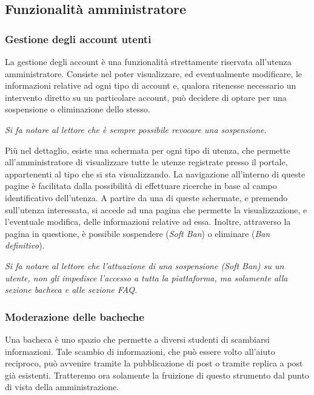\documentclass [a4paper,11pt]{book}
\begin{document}
\subsection{Funzionalità amministratore}

\subsubsection{Gestione degli account utenti}

La gestione degli account è una funzionalità strettamente riservata all'utenza  amministratore. Consiste nel poter visualizzare, ed eventualmente modificare, le informazioni relative ad ogni tipo di account e, qualora ritenesse necessario un intervento diretto su un particolare account, può decidere di optare per una sospensione o eliminazione dello stesso.

\emph{Si fa notare al lettore che è sempre possibile revocare una sospensione.} 

Più nel dettaglio, esiste una schermata per ogni tipo di utenza, che permette all'amministratore di visualizzare tutte le utenze registrate presso il portale, appartenenti al tipo che si sta visualizzando. La navigazione all'interno di queste pagine è facilitata dalla possibilità di effettuare ricerche in base al campo identificativo dell'utenza. 
A partire da una di queste schermate, e premendo sull'utenza interessata, si accede ad una pagina che permette la visualizzazione, e l'eventuale modifica, delle informazioni relative ad essa. Inoltre, attraverso la pagina in questione, è possibile sospendere (\emph{Soft Ban}) o eliminare (\emph{Ban definitivo}).

\medskip

\emph{Si fa notare al lettore che l'attuazione di una sospensione (\emph{Soft Ban}) su un utente, non gli impedisce l'accesso a tutta la piattaforma, ma solamente alla sezione bacheca e alle sezione FAQ.}


\medskip

\subsubsection{Moderazione delle bacheche}

Una bacheca è uno spazio che permette a diversi studenti di scambiarsi informazioni. Tale scambio di informazioni, che può essere volto all'aiuto reciproco, può avvenire tramite la pubblicazione di post o tramite replica a post già esistenti. Tratteremo ora solamente la fruizione di questo strumento dal punto di vista della amministrazione.
\end{document}
